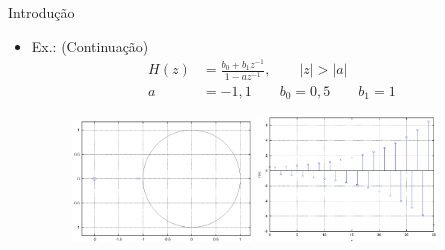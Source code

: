 \begin{slide}{Introdu\c c\~ao}
\begin{itemize}
   \item Ex.: (Continuação)
   \begin{align*}
      H(z) &= \frac{b_0 + b_1z^{-1}}{1-az^{-1}}, \qquad |z|>|a| \\
      a &= -1,1\qquad b_0=0,5\qquad b_1=1
   \end{align*}
   \begin{figure}
      \centering
      \includegraphics[width = 0.45\textwidth]{figs/pol_zer2.eps}
      \includegraphics[width = 0.45\textwidth]{figs/imp_resp2.eps}
   \end{figure}
\end{itemize}
\end{slide}

